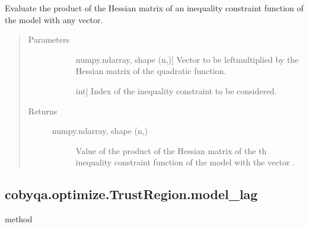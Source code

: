 \documentclass[letterpaper,10pt,english]{sphinxmanual}
\begin{document}
\begin{fulllineitems}
\begin{fulllineitems}
\label{\detokenize{refs/generated/cobyqa.optimize.TrustRegion.model_cub_hessp:cobyqa.optimize.TrustRegion.model_cub_hessp}}
\sphinxAtStartPar
Evaluate the product of the Hessian matrix of an inequality constraint
function of the model with any vector.
\begin{quote}\begin{description}
\item[{Parameters}] \leavevmode\begin{description}
\item[{}] \leavevmode{[}numpy.ndarray, shape (n,){]}
\sphinxAtStartPar
Vector to be left\sphinxhyphen{}multiplied by the Hessian matrix of the quadratic
function.

\item[{}] \leavevmode{[}int{]}
\sphinxAtStartPar
Index of the inequality constraint to be considered.

\end{description}

\item[{Returns}] \leavevmode\begin{description}
\item[{numpy.ndarray, shape (n,)}] \leavevmode
\sphinxAtStartPar
Value of the product of the Hessian matrix of the \sphinxhyphen{}th inequality
constraint function of the model with the vector .

\end{description}

\end{description}\end{quote}

\end{fulllineitems}



\subsection{cobyqa.optimize.TrustRegion.model\_lag}
\label{\detokenize{refs/generated/cobyqa.optimize.TrustRegion.model_lag:cobyqa-optimize-trustregion-model-lag}}\label{\detokenize{refs/generated/cobyqa.optimize.TrustRegion.model_lag::doc}}
\sphinxAtStartPar
method


\end{fulllineitems}
\end{document}

